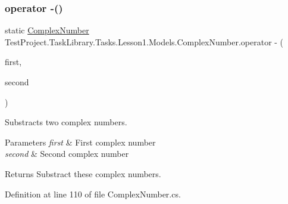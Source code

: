 \subsubsection{\texorpdfstring{operator -\/()}{operator -()}}
{\footnotesize\ttfamily static \mbox{\hyperlink{class_test_project_1_1_task_library_1_1_tasks_1_1_lesson1_1_1_models_1_1_complex_number}{Complex\+Number}} Test\+Project.\+Task\+Library.\+Tasks.\+Lesson1.\+Models.\+Complex\+Number.\+operator -\/ (\begin{DoxyParamCaption}\item[{\mbox{\hyperlink{class_test_project_1_1_task_library_1_1_tasks_1_1_lesson1_1_1_models_1_1_complex_number}{Complex\+Number}}}]{first,  }\item[{\mbox{\hyperlink{class_test_project_1_1_task_library_1_1_tasks_1_1_lesson1_1_1_models_1_1_complex_number}{Complex\+Number}}}]{second }\end{DoxyParamCaption})\hspace{0.3cm}{\ttfamily [static]}}



Substracts two complex numbers. 


\begin{DoxyParams}{Parameters}
{\em first} & First complex number\\
\hline
{\em second} & Second complex number\\
\hline
\end{DoxyParams}
\begin{DoxyReturn}{Returns}
Substract these complex numbers.
\end{DoxyReturn}


Definition at line 110 of file Complex\+Number.\+cs.

\mbox{\label{class_test_project_1_1_task_library_1_1_tasks_1_1_lesson1_1_1_models_1_1_complex_number_ab6be3b2b94d7a6646f238ff9fd7a25d6}} 
